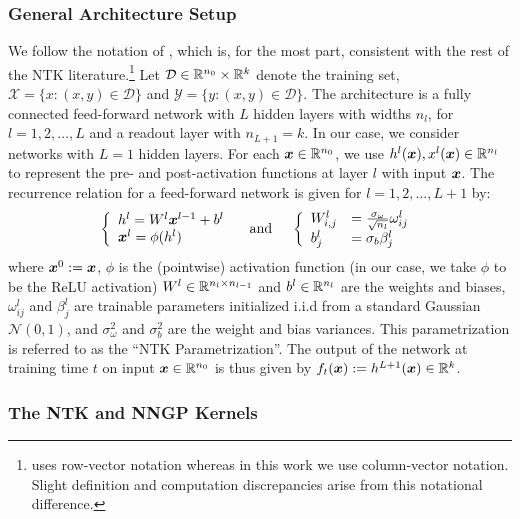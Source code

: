 \subsubsection{General Architecture Setup}
\label{subsub:arch}
We follow the notation of \citealt{NEURIPS2019_0d1a9651}, which is, for the most part, consistent with the rest of the NTK literature.\footnote{\citet{NEURIPS2019_0d1a9651} uses row-vector notation whereas in this work we use column-vector notation. Slight definition and computation discrepancies arise from this notational difference.} Let $\mathcal{D}\in \mathbb{R}^{n_0} \times \mathbb{R}^{k}$ denote the training set, $\mathcal{X} = \{x: (x, y) \in \mathcal{D}\}$ and $\mathcal{Y} = \{y: (x, y) \in \mathcal{D}\}$. The architecture is a fully connected feed-forward network with $L$
hidden layers with widths $n_l$, for $l=1,2,\dots, L$ and a readout layer with $n_{L+1}=k$. In our case, we consider networks with $L=1$ hidden layers. For each $\boldsymbol{x} \in \mathbb{R}^{n_0}$,
we use $h^l(\boldsymbol{x}), x^l(\boldsymbol{x}) \in \mathbb{R}^{n_l}$ to represent the pre- and post-activation functions at layer $l$ with input $\boldsymbol{x}$. The recurrence relation for a feed-forward network is given for $l = 1,2,\dots,L+1$ by:
$$
\left\{\begin{array} { l } 
{ h ^ { l} = W ^ { l } \boldsymbol{x} ^ { l-1 }  + b ^ { l } } \\
{ \boldsymbol{x} ^ { l } = \phi ( h ^ { l } ) }
\end{array} \quad \text{ and } \quad \left\{\begin{array}{ll}
W_{i, j}^l & =\frac{\sigma_\omega}{\sqrt{n_l}} \omega_{i j}^l \\
b_j^l & =\sigma_b \beta_j^l
\end{array}\right.\right.
$$
where $\boldsymbol{x}^0 := \boldsymbol{x}$, $\phi$ is the (pointwise) activation function (in our case, we take $\phi$ to be the ReLU activation) $W^{l}\in \mathbb{R}^{n_{l} \times n_{l-1}}$ and $b^{l} \in \mathbb{R}^{n_{l}}$ are the weights and biases, $\omega^{l}_{ij}$ and $\beta^{l}_j$ are trainable parameters initialized i.i.d from a standard Gaussian $\mathcal{N}(0,1)$, and $\sigma_\omega^2$ and $\sigma_b^2$ are the weight and bias variances. This parametrization is referred to as the ``NTK Parametrization''. The output of the network at training time $t$ on input $\boldsymbol{x} \in \mathbb{R}^{n_0}$ is thus given by $f_t(\boldsymbol{x}):=h^{L+1}(\boldsymbol{x}) \in \mathbb{R}^{k}$.

\subsubsection{The NTK and NNGP Kernels}
\label{subsub:kernels}
